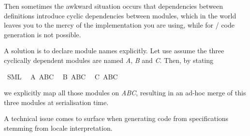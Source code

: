 \begin{isabellebody}
\begin{isamarkuptext}
  Then sometimes the awkward situation occurs that dependencies
  between definitions introduce cyclic dependencies between modules,
  which in the  world leaves you to the mercy of the
   implementation you are using, while for / code generation is not possible.

  A solution is to declare module names explicitly.  Let use assume
  the three cyclically dependent modules are named \emph{A}, \emph{B}
  and \emph{C}.  Then, by stating%
\end{isamarkuptext}%
\isamarkuptrue%
%
\isadelimquote
%
\endisadelimquote
%
\isatagquote
{}\isamarkupfalse%
\ SML\isanewline
\ \ A\ ABC\isanewline
\ \ B\ ABC\isanewline
\ \ C\ ABC%
\endisatagquote
{\isafoldquote}%
%
\isadelimquote
%
\endisadelimquote
%
\begin{isamarkuptext}%
\noindent we explicitly map all those modules on \emph{ABC},
  resulting in an ad-hoc merge of this three modules at serialisation
  time.%
\end{isamarkuptext}%
\isamarkuptrue%
%
\isamarkuptrue%
%
\begin{isamarkuptext}%
A technical issue comes to surface when generating code from
  specifications stemming from locale interpretation.


\end{isamarkuptext}
\end{isabellebody}
